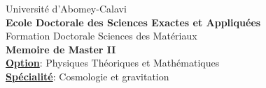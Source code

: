 \documentclass[a4paper,12pt]{report}
\title{
 }
\author{ 
}
\date{ 
}
\theoremstyle{plain}
\theoremstyle{plain}
\begin{document}
\begin{titlepage} 
\begin{center}
  Universit\'e d'Abomey-Calavi\\
{\bf Ecole Doctorale des Sciences Exactes et Appliqu\'ees }\\
Formation Doctorale Sciences des Mat\'eriaux\\[1cm]
\textbf{Memoire de Master II}\\
\underline{{\bf Option}}: Physiques Th\'eoriques et Math\'ematiques\\
\underline{{\bf Sp\'ecialit\'e}}: Cosmologie et gravitation
\end{center}


\end{titlepage}
\end{document}
